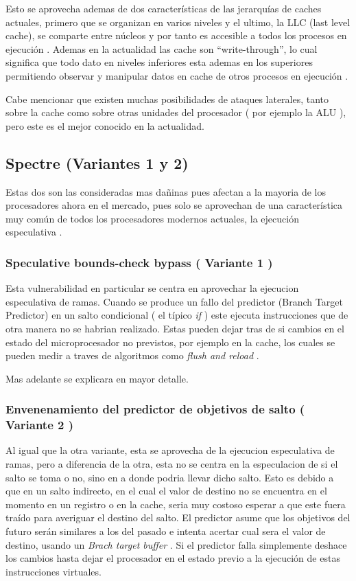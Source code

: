 \documentclass[paper=a4, fontsize=11pt]{scrartcl} %
\begin{document}
Esto se aprovecha ademas de dos características de las jerarquías de caches actuales, primero que se organizan en varios niveles y el ultimo, la LLC (last level cache), se comparte entre núcleos y por tanto es accesible a todos los procesos en ejecución \cite{patterson}. Ademas en la actualidad las cache son “write-through”, lo cual significa que todo dato en niveles inferiores esta ademas en los superiores \cite{patterson} permitiendo observar y manipular datos en cache de otros procesos en ejecución .


Cabe mencionar que existen muchas posibilidades de ataques laterales, tanto sobre la cache como sobre otras unidades del procesador ( por ejemplo la ALU ), pero este es el mejor conocido en la actualidad.


\subsection{ Spectre (Variantes 1 y 2)}

Estas dos son las consideradas mas dañinas pues afectan a la mayoria de los procesadores ahora en el mercado, pues solo se aprovechan de una característica muy común de todos los procesadores modernos actuales, la ejecución especulativa . 

\subsubsection{Speculative bounds-check bypass ( Variante 1 ) }

Esta vulnerabilidad en particular se centra en aprovechar la ejecucion especulativa de ramas. Cuando se produce un fallo del predictor (Branch Target Predictor) en un salto condicional ( el típico \textit{if} ) este ejecuta instrucciones que de otra manera no se habrian realizado. Estas pueden dejar tras de si cambios en el estado del microprocesador no previstos, por ejemplo en la cache, los cuales se pueden medir a traves de algoritmos como \textit{flush and reload} \cite{spectre}.

Mas adelante se explicara en mayor detalle.



\subsubsection{Envenenamiento del predictor de objetivos de salto ( Variante 2 ) }

Al igual que la otra variante, esta se aprovecha de la ejecucion especulativa de ramas, pero a diferencia de la otra, esta no se centra en la especulacion de si el salto se toma o no, sino en a donde podria llevar dicho salto. Esto es debido a que en un salto indirecto, en el cual el valor de destino no se encuentra en el momento en un registro o en la cache, seria muy costoso esperar a que este fuera traído para averiguar el destino del salto. El predictor asume que los objetivos del futuro serán similares a los del pasado e intenta acertar cual sera el valor de destino,  usando un \textit{Brach target buffer} \cite{patterson}. Si el predictor falla simplemente deshace los cambios hasta dejar el procesador en el estado previo a la ejecución de estas instrucciones virtuales.
 
\end{document}
